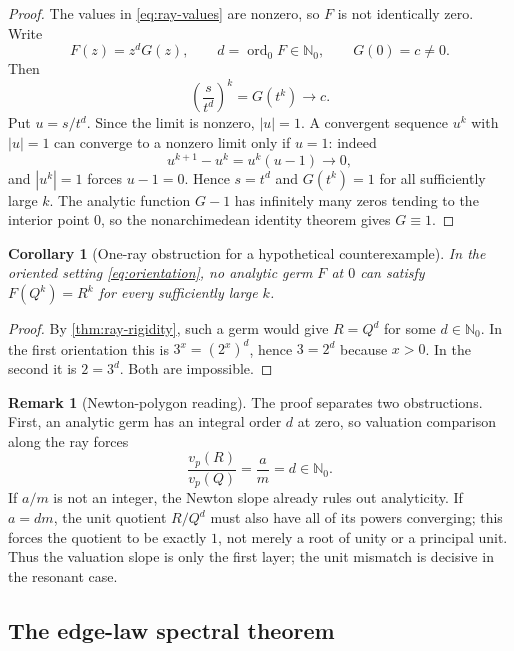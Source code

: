 \documentclass[11pt,oneside]{article}
\newtheorem{corollary}[theorem]{Corollary}
\theoremstyle{definition}
\newtheorem{remark}[theorem]{Remark}
\newcommand{\Nzero}{\mathbb N_0}
\newcommand{\vp}{v_p}
\newcommand{\ord}{\operatorname{ord}}
\begin{document}
\begin{proof}
The values in \eqref{eq:ray-values} are nonzero, so $F$ is not identically zero.  Write
\[
 F(z)=z^dG(z),
 \qquad d=\ord_0F\in\Nzero,
 \qquad G(0)=c\ne0.
\]
Then
\begin{equation}\label{eq:u-powers-converge}
 \left(\frac{s}{t^d}\right)^k=G(t^k)\longrightarrow c.
\end{equation}
Put $u=s/t^d$.  Since the limit is nonzero, $|u|=1$.  A convergent sequence $u^k$ with
$|u|=1$ can converge to a nonzero limit only if $u=1$: indeed
\[
 u^{k+1}-u^k=u^k(u-1)\longrightarrow0,
\]
and $|u^k|=1$ forces $u-1=0$.  Hence $s=t^d$ and $G(t^k)=1$ for all sufficiently large
$k$.  The analytic function $G-1$ has infinitely many zeros tending to the interior point
$0$, so the nonarchimedean identity theorem gives $G\equiv1$.
\end{proof}

\begin{corollary}[One-ray obstruction for a hypothetical counterexample]
\label{cor:one-ray-AE}
In the oriented setting \eqref{eq:orientation}, no analytic germ $F$ at $0$ can satisfy
$F(Q^k)=R^k$ for every sufficiently large $k$.
\end{corollary}

\begin{proof}
By \cref{thm:ray-rigidity}, such a germ would give $R=Q^d$ for some $d\in\Nzero$.  In the
first orientation this is $3^x=(2^x)^d$, hence $3=2^d$ because $x>0$.  In the second it is
$2=3^d$.  Both are impossible.
\end{proof}

\begin{remark}[Newton-polygon reading]\label{rem:newton-slope}
The proof separates two obstructions.  First, an analytic germ has an integral order $d$ at
zero, so valuation comparison along the ray forces
\[
 \frac{\vp(R)}{\vp(Q)}=\frac am=d\in\Nzero.
\]
If $a/m$ is not an integer, the Newton slope already rules out analyticity.  If $a=dm$, the
unit quotient $R/Q^d$ must also have all of its powers converging; this forces the quotient to
be exactly $1$, not merely a root of unity or a principal unit.  Thus the valuation slope is
only the first layer; the unit mismatch is decisive in the resonant case.
\end{remark}

\subsection{The edge-law spectral theorem}
\end{document}
